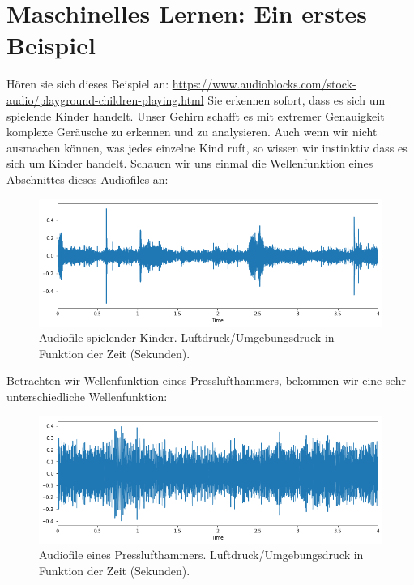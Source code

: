 \documentclass{thesisclass}
\begin{document}
\section{Maschinelles Lernen: Ein erstes Beispiel}
	Hören sie sich dieses Beispiel an: \hyperlink{https://www.audioblocks.com/stock-audio/playground-children-playing.html}{https://www.audioblocks.com/stock-audio/playground-children-playing.html}\newline
	Sie erkennen sofort, dass es sich um spielende Kinder handelt. Unser Gehirn schafft es mit extremer Genauigkeit komplexe Geräusche zu erkennen und zu analysieren. Auch wenn wir nicht ausmachen können, was jedes einzelne Kind ruft, so wissen wir instinktiv dass es sich um Kinder handelt. Schauen wir uns einmal die Wellenfunktion eines Abschnittes dieses Audiofiles an:
\begin{figure}[H]
\includegraphics[width=\textwidth]{images/KidsPlaying.png}
  \caption{Audiofile spielender Kinder. Luftdruck/Umgebungsdruck in Funktion der Zeit  (Sekunden). \cite{shaikh_faizan_2017}}
  \label{fig:Audiofile Spielende Kinder}
\end{figure}

Betrachten wir Wellenfunktion eines Presslufthammers, bekommen wir eine sehr unterschiedliche Wellenfunktion:
\begin{figure}[H]
\includegraphics[width=\textwidth]{images/jackhammer.png}
  \caption{Audiofile eines Presslufthammers. Luftdruck/Umgebungsdruck in Funktion der Zeit  (Sekunden). \cite{shaikh_faizan_2017}}
  \label{fig:Audiofile pressluftHammer}
\end{figure}
\end{document}
